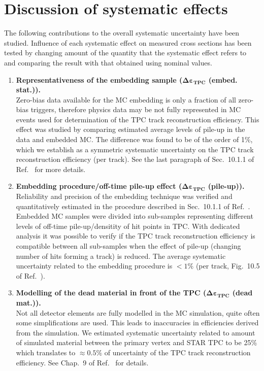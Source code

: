 
\section{Discussion of systematic effects}\label{sec:systEffectsList}
The following contributions to the overall systematic uncertainty have been studied. Influence of each systematic effect on measured cross sections has been tested by changing amount of the quantity that the systematic effect refers to and comparing the result with that obtained using nominal values.

\begin{enumerate}
 \item \textbf{Representativeness of the embedding sample ($\bm{\Delta\varepsilon_{\text{TPC}}}$ (embed. stat.)).}\\
 Zero-bias data available for the MC embedding is only a fraction of all zero-bias triggers, therefore physics data may be not fully represented in MC events used for determination of the TPC track reconstruction efficiency. This effect was studied by comparing estimated average levels of pile-up in the data and embedded MC. The difference was found to be of the order of 1\%, which we establish as a symmetric systematic uncertainty on the TPC track reconstruction efficiency (per track). See the last paragraph of Sec.~10.1.1 of Ref.~\cite{supplementaryNote} for more details.
 \item \textbf{Embedding procedure/off-time pile-up effect ($\bm{\Delta\varepsilon_{\text{TPC}}}$ (pile-up)).}\\
 Reliability and precision of the embedding technique was verified and quantitatively estimated in the procedure described in Sec.~10.1.1 of Ref.~\cite{supplementaryNote}. Embedded MC samples were divided into sub-samples representing different levels of off-time pile-up/densitity of hit points in TPC. With dedicated analysis it was possible to verify if the TPC track reconstruction efficiency is compatible between all sub-samples when the effect of pile-up (changing number of hits forming a track) is reduced. The average systematic uncertainty related to the embedding procedure is $<1\%$ (per track, Fig.~10.5 of Ref.~\cite{supplementaryNote}).
 \item \textbf{Modelling of the dead material in front of the TPC ($\bm{\Delta\varepsilon_{\text{TPC}}}$ (dead mat.)).}\\
 Not all detector elements are fully modelled in the MC simulation, quite often some simplifications are used. This leads to inaccuracies in efficiencies derived from the simulation. We estimated systematic uncertainty related to amount of simulated material between the primary vertex and STAR TPC to be 25\% which translates to $\approx 0.5\%$ of uncertainty of the TPC track reconstruction efficiency. See Chap.~9 of Ref.~\cite{supplementaryNote} for details.

\end{enumerate}
